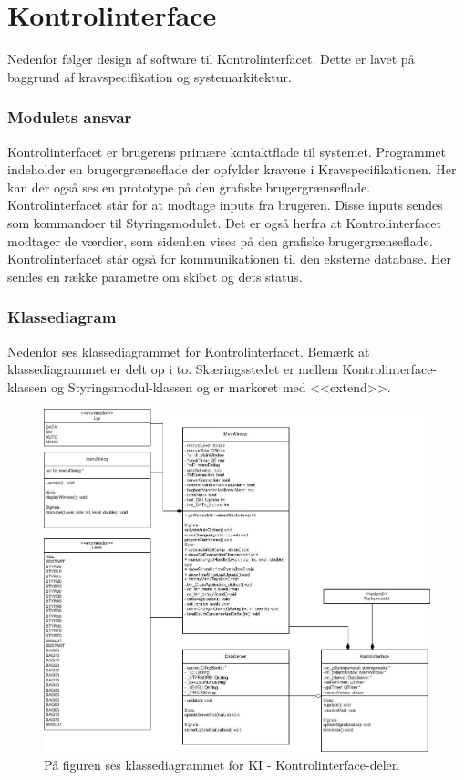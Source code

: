 \chapter{Kontrolinterface}
Nedenfor følger design af software til Kontrolinterfacet. Dette er lavet på baggrund af kravspecifikation og systemarkitektur. 
\subsection{Modulets ansvar}
Kontrolinterfacet er brugerens primære kontaktflade til systemet. Programmet indeholder en brugergrænseflade der opfylder kravene i Kravspecifikationen. Her kan der også ses en prototype på den grafiske brugergrænseflade.
Kontrolinterfacet står for at modtage inputs fra brugeren. Disse inputs sendes som kommandoer til Styringsmodulet. Det er også herfra at Kontrolinterfacet modtager de værdier, som sidenhen vises på den grafiske brugergrænseflade. Kontrolinterfacet står også for kommunikationen til den eksterne database. Her sendes en række parametre om skibet og dets status.

\subsection{Klassediagram}
Nedenfor ses klassediagrammet for Kontrolinterfacet. Bemærk at klassediagrammet er delt op i to. Skæringsstedet er mellem Kontrolinterface-klassen og Styringsmodul-klassen og er markeret med <<extend>>.

\begin{figure}[H]
\centering
\includegraphics[width=1\textwidth]{billeder/KI-Class}
\caption{På figuren ses klassediagrammet for KI - Kontrolinterface-delen}
\end{figure}

